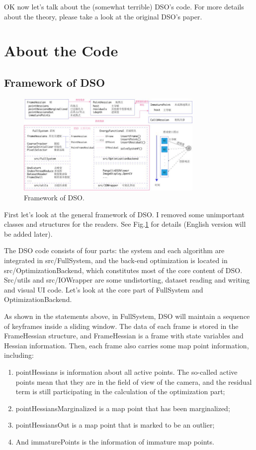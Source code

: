 \documentclass[a4paper,10pt]{article}
\begin{document}
	OK now let's talk about the (somewhat terrible) DSO's code. For more details about the theory, please take a look at the original DSO's paper.
	
	\section{About the Code}
	\subsection{Framework of DSO}
	\begin{figure}[htp]
	\centering
	\label{fig:framework-dso}
	\includegraphics[width=0.8\textwidth]{figs/dso-framework-cn.jpg}
	\caption{Framework of DSO.}
	\end{figure}
	First let's look at the general framework of DSO. I removed some unimportant classes and structures for the readers. See Fig.\ref{fig:framework-dso} for details (English version will be added later).
	
	The DSO code consists of four parts: the system and each algorithm are integrated in src/FullSystem, and the back-end optimization is located in src/OptimizationBackend, which constitutes most of the core content of DSO. Src/utils and src/IOWrapper are some undistorting, dataset reading and writing and visual UI code. Let's look at the core part of FullSystem and OptimizationBackend.
	
	As shown in the statements above, in FullSystem, DSO will maintain a sequence of keyframes inside a sliding window. The data of each frame is stored in the FrameHessian structure, and FrameHessian is a frame with state variables and Hessian information. Then, each frame also carries some map point information, including:
	\begin{enumerate}
	\item pointHessians is information about all active points. The so-called active points mean that they are in the field of view of the camera, and the residual term is still participating in the calculation of the optimization part;
	\item pointHessiansMarginalized is a map point that has been marginalized;
	\item pointHessiansOut is a map point that is marked to be an outlier;
	\item And immaturePoints is the information of immature map points.
	\end{enumerate}
	
\end{document}
